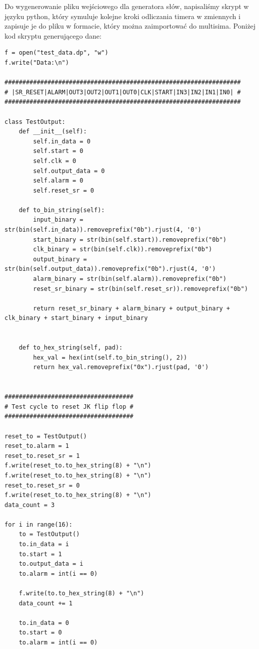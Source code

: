 \documentclass[a4paper]{article}
\begin{document}
Do wygenerowanie pliku wejściowego dla generatora słów, napisaliśmy skrypt w języku python, który 
symuluje kolejne kroki odliczania timera w zmiennych i zapisuje je do pliku w formacie, który można zaimportować 
do multisima.
\pagebreak
Poniżej kod skryptu generującego dane:
\small
\begin{verbatim}
f = open("test_data.dp", "w")
f.write("Data:\n")

##################################################################
# |SR_RESET|ALARM|OUT3|OUT2|OUT1|OUT0|CLK|START|IN3|IN2|IN1|IN0| #
##################################################################

class TestOutput: 
    def __init__(self):
        self.in_data = 0
        self.start = 0
        self.clk = 0
        self.output_data = 0
        self.alarm = 0
        self.reset_sr = 0

    def to_bin_string(self):
        input_binary = str(bin(self.in_data)).removeprefix("0b").rjust(4, '0')
        start_binary = str(bin(self.start)).removeprefix("0b")
        clk_binary = str(bin(self.clk)).removeprefix("0b")
        output_binary = str(bin(self.output_data)).removeprefix("0b").rjust(4, '0')
        alarm_binary = str(bin(self.alarm)).removeprefix("0b")
        reset_sr_binary = str(bin(self.reset_sr)).removeprefix("0b")

        return reset_sr_binary + alarm_binary + output_binary + clk_binary + start_binary + input_binary
    

    def to_hex_string(self, pad):
        hex_val = hex(int(self.to_bin_string(), 2))
        return hex_val.removeprefix("0x").rjust(pad, '0')


####################################
# Test cycle to reset JK flip flop #
####################################

reset_to = TestOutput()
reset_to.alarm = 1
reset_to.reset_sr = 1
f.write(reset_to.to_hex_string(8) + "\n")
f.write(reset_to.to_hex_string(8) + "\n")
reset_to.reset_sr = 0
f.write(reset_to.to_hex_string(8) + "\n")
data_count = 3

for i in range(16):
    to = TestOutput()
    to.in_data = i
    to.start = 1
    to.output_data = i 
    to.alarm = int(i == 0)

    f.write(to.to_hex_string(8) + "\n")
    data_count += 1

    to.in_data = 0
    to.start = 0
    to.alarm = int(i == 0)


\end{verbatim}
\end{document}
